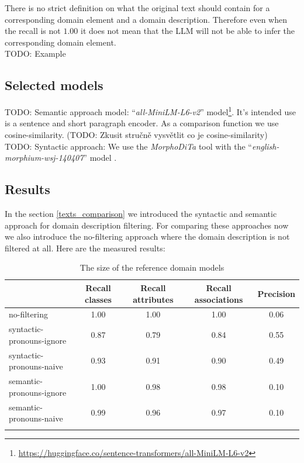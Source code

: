There is no strict definition on what the original text should contain for a corresponding domain element and a domain description. Therefore even when the recall is not $1.00$ it does not mean that the LLM will not be able to infer the corresponding domain element. \\

TODO: Example \\


\subsection{Selected models}

TODO: Semantic approach model: ``\textit{all-MiniLM-L6-v2}'' model\footnote{\url{https://huggingface.co/sentence-transformers/all-MiniLM-L6-v2}}. It's intended use is a sentence and short paragraph encoder. As a comparison function we use cosine-similarity. (TODO: Zkusit stručně vysvětlit co je cosine-similarity) \\

TODO: Syntactic approach: We use the \textit{MorphoDiTa} tool \cite{Strakova2014} with the ``\textit{english-morphium-wsj-140407}'' model \cite{Straka2014}. \\


\subsection{Results}

In the section \ref{texts_comparison} we introduced the syntactic and semantic approach for domain description filtering. For comparing these approaches now we also introduce the no-filtering approach where the domain description is not filtered at all. Here are the measured results:

\begin{table}[!h]
    \scriptsize
    \centering
    \setlength{\tabcolsep}{0.5em}
    \begin{tabular}{lcccc}

    \toprule
         & Recall classes & Recall attributes & Recall associations & Precision \\
    \toprule
    
    \addlinespace
         no-filtering      & 1.00  & 1.00  & 1.00 & 0.06 \\
    	 syntactic-pronouns-ignore & 0.87 & 0.79 & 0.84 & 0.55 \\
         syntactic-pronouns-naive & 0.93  & 0.91  & 0.90 & 0.49 \\
         semantic-pronouns-ignore & 1.00 & 0.98 & 0.98 & 0.10 \\
         semantic-pronouns-naive & 0.99 & 0.96 & 0.97 & 0.10 \\
    \addlinespace
    \bottomrule
    \addlinespace
    \end{tabular}
    \caption{The size of the reference domain models}
    \label{tab:filtering-results}
\end{table}

